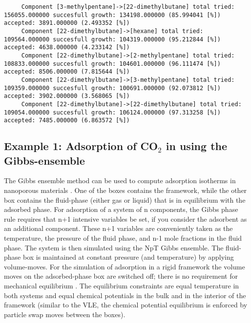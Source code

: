 \begin{tiny}
\begin{verbatim}
     Component [3-methylpentane]->[22-dimethylbutane] total tried: 156055.000000 succesfull growth: 134198.000000 (85.994041 [%]) accepted: 3891.000000 (2.493352 [%])
     Component [22-dimethylbutane]->[hexane] total tried: 109564.000000 succesfull growth: 104319.000000 (95.212844 [%]) accepted: 4638.000000 (4.233142 [%])
     Component [22-dimethylbutane]->[2-methylpentane] total tried: 108833.000000 succesfull growth: 104601.000000 (96.111474 [%]) accepted: 8506.000000 (7.815644 [%])
     Component [22-dimethylbutane]->[3-methylpentane] total tried: 109359.000000 succesfull growth: 100691.000000 (92.073812 [%]) accepted: 3902.000000 (3.568065 [%])
     Component [22-dimethylbutane]->[22-dimethylbutane] total tried: 109054.000000 succesfull growth: 106124.000000 (97.313258 [%]) accepted: 7485.000000 (6.863572 [%])
\end{verbatim}
\end{tiny}


\subsection*{Example 1: Adsorption of CO$_2$ in using the Gibbs-ensemble}

The Gibbs ensemble method can be used to compute adsorption isotherms in nanoporous materials \cite{Panagiotopoulos1987,McGrother1999}.
One of the boxes contains the framework, while the other box contains the fluid-phase
(either gas or liquid) that is in equilibrium with the adsorbed phase.
For adsorption of a system of n components, the Gibbs phase rule requires that n+1 intensive variables be set,
if you consider the adsorbent as an additional component.  These n+1 variables are conveniently taken as the
temperature, the pressure of the fluid phase, and n-1 mole fractions in the fluid phase.
The system is then simulated using the NpT Gibbs ensemble.
The fluid-phase box is maintained at constant pressure (and temperature) by applying volume-moves.
For the simulation of adsorption in a rigid framework the volume
moves on the adsorbed-phase box are switched off; there is no requirement for mechanical equilibrium \cite{Panagiotopoulos1987}.
The equilibrium constraints are equal temperature in both systems and equal chemical potentials
in the bulk and in the interior of the framework (similar to the VLE, the chemical potential equilibrium is
enforced by particle swap moves between the boxes).

